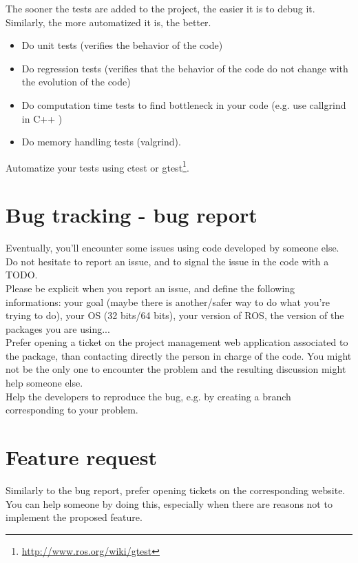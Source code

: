 The sooner the tests are added to the project, the easier it is to debug it.
Similarly, the more automatized it is, the better.
\begin{itemize}[noitemsep,topsep=0pt,parsep=0pt,partopsep=0pt]
\item Do unit tests (verifies the behavior of the code)
\item Do regression tests (verifies that the behavior of the code do not change with the evolution of the code)
\item Do computation time tests to find bottleneck in your code (e.g. use callgrind in C++ )
\item Do memory handling tests (valgrind).
\end{itemize}

Automatize your tests using ctest or gtest\footnote{\url{http://www.ros.org/wiki/gtest}}.

\section{Bug tracking - bug report}
Eventually, you'll encounter some issues using code developed by someone else.\\
Do not hesitate to report an issue, and to signal the issue in the code with a TODO.\\
Please be explicit when you report an issue, and define the following informations:
your goal (maybe there is another/safer way to do what you're trying to do), 
your OS (32 bits/64 bits), your version of ROS, the version of the packages you are using...\\

Prefer opening a ticket on the project management web application associated to the package, than contacting directly the person in charge of the code. 
You might not be the only one to encounter the problem and the resulting discussion might help someone else.\\

Help the developers to reproduce the bug, e.g. by creating a branch corresponding to your problem.



\section{Feature request}
Similarly to the bug report, prefer opening tickets on the corresponding website.
You can help someone by doing this, especially when there are reasons not to implement the proposed feature.

